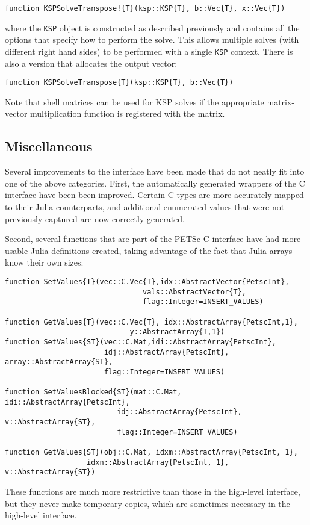 \documentclass{article}
\begin{document}
\begin{verbatim}
function KSPSolveTranspose!{T}(ksp::KSP{T}, b::Vec{T}, x::Vec{T})
\end{verbatim}

where the \texttt{KSP} object is constructed as described previously and 
contains all the options that specify how to perform the solve.  This
allows multiple solves (with different right hand sides) to be performed 
with a single \texttt{KSP} context.  There is also a version that allocates 
the output vector:

\begin{verbatim}
function KSPSolveTranspose{T}(ksp::KSP{T}, b::Vec{T})
\end{verbatim}

Note that shell matrices can be used for KSP solves if the appropriate 
matrix-vector multiplication function is registered with the matrix.

\subsection{Miscellaneous}
Several improvements to the interface have been made that do not neatly fit 
into one of the above categories.
First, the automatically generated wrappers of the C interface have been 
been improved.  Certain C types are more accurately mapped to their Julia 
counterparts, and additional enumerated values that were not previously
captured are now correctly generated.

Second, several functions that are part of the PETSc C interface have had
more usable Julia definitions created, taking advantage of the fact that Julia
arrays know their own sizes:

\begin{verbatim}
function SetValues{T}(vec::C.Vec{T},idx::AbstractVector{PetscInt},
                                vals::AbstractVector{T},
                                flag::Integer=INSERT_VALUES)

function GetValues{T}(vec::C.Vec{T}, idx::AbstractArray{PetscInt,1}, 
                             y::AbstractArray{T,1})
function SetValues{ST}(vec::C.Mat,idi::AbstractArray{PetscInt},
                       idj::AbstractArray{PetscInt}, array::AbstractArray{ST},
                       flag::Integer=INSERT_VALUES)

function SetValuesBlocked{ST}(mat::C.Mat, idi::AbstractArray{PetscInt}, 
                          idj::AbstractArray{PetscInt}, v::AbstractArray{ST}, 
                          flag::Integer=INSERT_VALUES)

function GetValues{ST}(obj::C.Mat, idxm::AbstractArray{PetscInt, 1}, 
                   idxn::AbstractArray{PetscInt, 1}, v::AbstractArray{ST})
\end{verbatim}

\noindent These functions are much more restrictive than those in the high-level
interface, but they never make temporary copies, which are sometimes 
necessary in the high-level interface.
\end{document}
